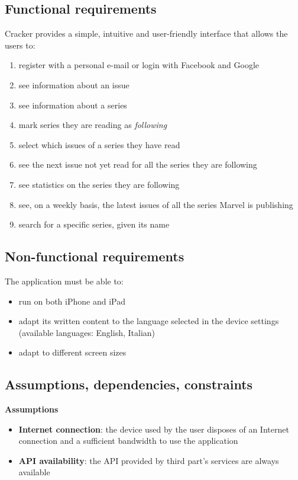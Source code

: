 \subsection{Functional requirements}
Cracker provides a simple, intuitive and user-friendly interface that allows the users to:
\begin{enumerate}
\item register with a personal e-mail or login with Facebook and Google
\item see information about an issue
\item see information about a series
\item mark series they are reading as {\slshape{following}}
\item select which issues of a series they have read
\item see the next issue not yet read for all the series they are following
\item see statistics on the series they are following
\item see, on a weekly basis, the latest issues of all the series Marvel is publishing
\item search for a specific series, given its name
\end{enumerate}


\subsection{Non-functional requirements}
The application must be able to:
\begin{itemize}
\item run on both iPhone and iPad
\item adapt its written content to the language selected in the device settings (available languages: English, Italian)
\item adapt to different screen sizes
\end{itemize}


\subsection{Assumptions, dependencies, constraints}
{\textbf{\large{Assumptions}}}
\begin{itemize}
\item {\textbf{Internet connection}}: the device used by the user disposes of an Internet connection and a sufficient bandwidth to use the application
\item {\textbf{API availability}}: the API provided by third part's services are always available
\end{itemize}


